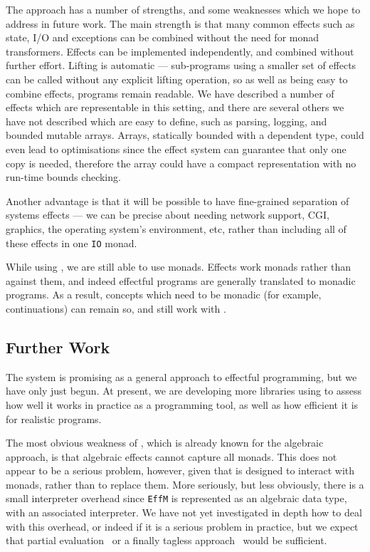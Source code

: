The \Eff{} approach has a number of strengths, and some weaknesses which
we hope to address in future work. The main strength is that many
common effects such as state, I/O and exceptions can be combined without
the need for monad transformers. Effects can be implemented independently,
and combined without further effort. Lifting is automatic --- sub-programs
using a smaller set of effects can be called without any explicit lifting
operation, so as well as being easy to combine effects, programs
remain readable. We have described a number of effects which are representable
in this setting, and there are several others we have not described which
are easy to define, such as parsing, logging, and bounded mutable arrays.
Arrays, statically bounded with a dependent type, could even lead to optimisations
since the effect system can guarantee that only one copy is needed, therefore
the array could have a compact representation with no run-time bounds
checking.

Another advantage is that it will be possible to have fine-grained separation
of systems effects --- we can be precise about needing network support, CGI,
graphics, the operating system's environment, etc, rather than including all of
these effects in one \texttt{IO} monad.

While using \Eff{}, we are still able to use monads.  Effects work 
monads rather than against them, and indeed effectful programs are generally
translated to monadic
programs. As a result, concepts which need to be monadic (for example,
continuations) can remain so, and still work with \Eff{}.

\subsection*{Further Work}

The \Eff{} system is promising as a general approach to effectful programming,
but we have only just begun. At present, we are developing more libraries
using \Eff{} to assess how well it works in practice as a programming tool,
as well as how efficient it is for realistic programs.

The most obvious weakness of \Eff{}, which is already known for the algebraic
approach, is that algebraic effects cannot capture all monads. This does not
appear to be a serious problem, however, given that \Eff{} is
designed to interact with monads, rather than to replace them. More seriously,
but less obviously, there is a small interpreter overhead since \texttt{EffM}
is represented as an algebraic data type, with an associated interpreter.  We
have not yet investigated in depth how to deal with this overhead, or indeed if
it is a serious problem in practice, but we expect that partial
evaluation~\cite{Brady2010} or a finally tagless approach~\cite{Carette2009}
would be sufficient. 

